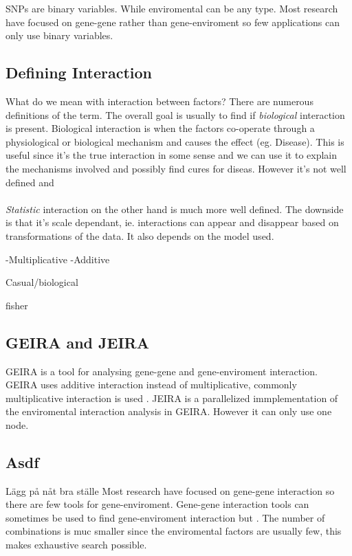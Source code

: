 \documentclass[10pt,a4paper]{article}
\begin{document}
SNPs are binary variables.
While enviromental can be any type. Most research have focused on gene-gene rather than gene-enviroment so few applications can only use binary variables. 
\cite{gene_enviroment_2013}

\subsection{Defining Interaction}
What do we mean with interaction between factors? There are numerous definitions of the term. The overall goal is usually to find if \emph{biological} interaction is present. Biological interaction is when the factors co-operate through a physiological or biological mechanism and causes the effect (eg. Disease). This is useful since it's the true interaction in some sense and we can use it to explain the mechanisms involved and possibly find cures for diseas. However it's not well defined and\\
\\
\emph{Statistic} interaction on the other hand is much more well defined. The downside is that it's scale dependant, ie. interactions can appear and disappear based on transformations of the data. It also depends on the model used.

-Multiplicative
-Additive

Casual/biological

fisher

\subsection{GEIRA and JEIRA}
GEIRA is a tool for analysing gene-gene and gene-enviroment interaction. GEIRA uses additive interaction instead of multiplicative, commonly multiplicative interaction is used \cite{geira}. JEIRA is a parallelized immplementation of the enviromental interaction analysis in GEIRA. However it can only use one node.



\subsection{Asdf}
Lägg på nåt bra ställe
Most research have focused on gene-gene interaction so there are few tools for gene-enviroment. Gene-gene interaction tools can sometimes be used to find gene-enviroment interaction but . The number of combinations is muc smaller since the enviromental factors are usually few, this makes exhaustive search possible.
\end{document}
